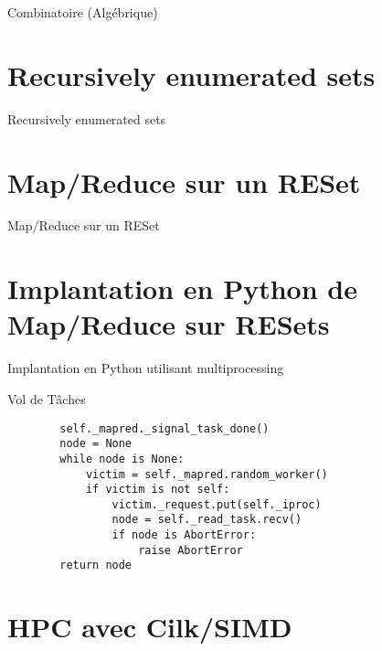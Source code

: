 \documentclass[compress,11pt]{beamer}
\begin{document}
\begin{frame}{Combinatoire (Algébrique)}
\end{frame}

\section{Recursively enumerated sets}

\begin{frame}{Recursively enumerated sets}
\end{frame}

\section{Map/Reduce sur un RESet}

\begin{frame}{Map/Reduce sur un RESet}
\end{frame}

\section{Implantation en Python de Map/Reduce sur RESets}

\begin{frame}{Implantation en Python utilisant multiprocessing}
\end{frame}

\begin{frame}[fragile]{Vol de Tâches}
\begin{verbatim}
        self._mapred._signal_task_done()
        node = None
        while node is None:
            victim = self._mapred.random_worker()
            if victim is not self:
                victim._request.put(self._iproc)
                node = self._read_task.recv()
                if node is AbortError:
                    raise AbortError
        return node
\end{verbatim}

\section{HPC avec Cilk/SIMD}

\end{frame}
\end{document}
